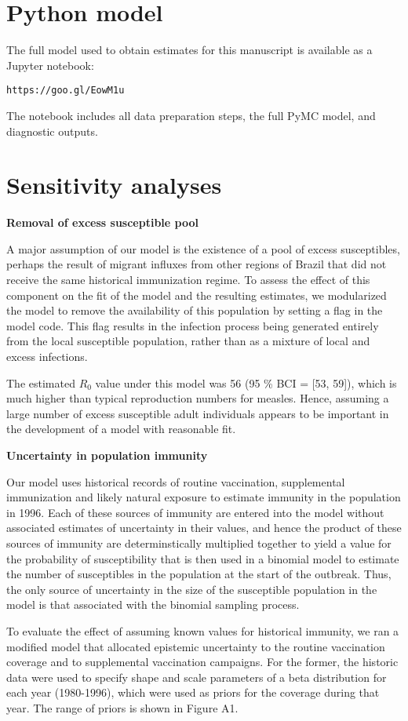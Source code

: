 \appendix

\section{Python model}

The full model used to obtain estimates for this manuscript is available as a Jupyter notebook:

\verb|https://goo.gl/EowM1u|

The notebook includes all data preparation steps, the full PyMC model, and diagnostic outputs.

\section{Sensitivity analyses}

\textbf{Removal of excess susceptible pool}

A major assumption of our model is the existence of a pool of excess susceptibles, perhaps the result of migrant influxes from other regions of Brazil that did not receive the same historical immunization regime. To assess the effect of this component on the fit of the model and the resulting estimates, we modularized the model to remove the availability of this population by setting a flag in the model code. This flag results in the infection process being generated entirely from the local susceptible population, rather than as a mixture of local and excess infections.

The estimated $R_0$ value under this model was 56 (95 \% BCI = [53, 59]), which is much higher than typical reproduction numbers for measles\cite{Durrheim_2014}. Hence, assuming a large number of excess susceptible adult individuals appears to be important in the development of a model with reasonable fit.

\textbf{Uncertainty in population immunity}

Our model uses historical records of routine vaccination, supplemental immunization and likely natural exposure to estimate immunity in the population in 1996. Each of these sources of immunity are entered into the model without associated estimates of uncertainty in their values, and hence the product of these sources of immunity are determinstically multiplied together to yield a value for the probability of susceptibility that is then used in a binomial model to estimate the number of susceptibles in the population at the start of the outbreak. Thus, the only source of uncertainty in the size of the susceptible population in the model is that associated with the binomial sampling process.

To evaluate the effect of assuming known values for historical immunity, we ran a modified model that allocated epistemic uncertainty to the routine vaccination coverage and to supplemental vaccination campaigns. For the former, the historic data were used to specify shape and scale parameters of a beta distribution for each year (1980-1996), which were used as priors for the coverage during that year. The range of priors is shown in Figure A1.
